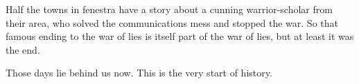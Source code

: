 \begin{exampletext}
    Half the towns in \gls{fenestra} have a story about a cunning warrior-scholar from their area, who solved the communications mess and stopped the war.
    So that famous ending to the war of lies is itself part of the war of lies, but at least it was the end.

    Those days lie behind us now.
    This is the very start of history.
  \fi

\end{exampletext}

